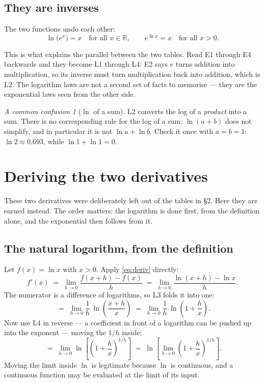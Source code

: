 \documentclass[11pt]{article}
\theoremstyle{plain}
\theoremstyle{definition}
\theoremstyle{remark}
\newtheorem*{warn}{A common confusion}
\newcommand{\R}{\mathbb{R}}
\begin{document}
\subsection{They are inverses}
The two functions undo each other:
\begin{equation}\label{eq:inverse}
  \ln\bigl(e^{x}\bigr)=x \quad\text{for all } x\in\R,
  \qquad
  e^{\ln x}=x \quad\text{for all } x>0 .
\end{equation}

\noindent This is what explains the parallel between the two tables. Read E1
through E4 backwards and they become L1 through L4: E2 says $e$ turns addition
into multiplication, so its inverse must turn multiplication back into addition,
which is L2. The logarithm laws are not a second set of facts to memorise --- they
are the exponential laws seen from the other side.

\begin{warn}[$\ln$ of a sum]
L2 converts the log of a \emph{product} into a sum. There is no corresponding
rule for the log of a sum: $\ln(a+b)$ does not simplify, and in particular it is
not $\ln a+\ln b$. Check it once with $a=b=1$: $\ln 2\approx0.693$, while
$\ln1+\ln1=0$.
\end{warn}

\section{Deriving the two derivatives}
These two derivatives were deliberately left out of the tables in \S2. Here they
are earned instead. The order matters: the logarithm is done first, from the
definition alone, and the exponential then follows from it.

\subsection{The natural logarithm, from the definition}
Let $f(x)=\ln x$ with $x>0$. Apply \eqref{eq:deriv} directly:
\[
  f'(x)
  \;=\;\lim_{h\to0}\frac{f(x+h)-f(x)}{h}
  \;=\;\lim_{h\to0}\frac{\ln(x+h)-\ln x}{h} .
\]
The numerator is a difference of logarithms, so L3 folds it into one:
\[
  \;=\;\lim_{h\to0}\frac{1}{h}\,\ln\!\left(\frac{x+h}{x}\right)
  \;=\;\lim_{h\to0}\frac{1}{h}\,\ln\!\left(1+\frac{h}{x}\right) .
\]
Now use L4 in reverse --- a coefficient in front of a logarithm can be pushed up
into the exponent --- moving the $1/h$ inside:
\[
  \;=\;\lim_{h\to0}\ln\!\left[\left(1+\frac{h}{x}\right)^{1/h}\right]
  \;=\;\ln\!\left[\lim_{h\to0}\left(1+\frac{h}{x}\right)^{1/h}\right] .
\]
Moving the limit inside $\ln$ is legitimate because $\ln$ is continuous, and a
continuous function may be evaluated at the limit of its input.
\end{document}
